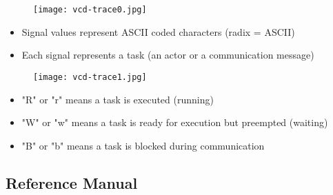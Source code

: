 \begin{frame}[t]
\begin{figure}
\centering
\texttt{[image: vcd-trace0.jpg]}
\end{figure}

\begin{itemize}
\item Signal values represent ASCII coded characters (radix = ASCII)
\item Each signal represents a task (an actor or a communication message)
\end{itemize}

\end{frame}


\begin{frame}[t]
\begin{figure}
\centering
\texttt{[image: vcd-trace1.jpg]}
\end{figure}

\begin{itemize}
\item "R" or "r" means a task is executed (running)
\item "W" or "w" means a task is ready for execution but preempted (waiting)
\item "B" or "b" means a task is blocked during communication
\end{itemize}

\end{frame}


\subsection{Reference Manual}


